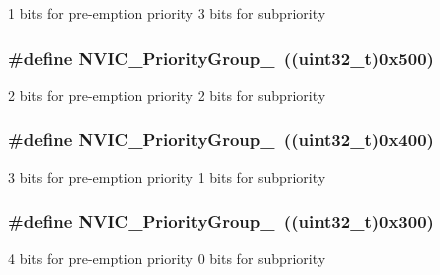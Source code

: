 \label{group__Preemption__Priority__Group_ga89bf0bf9e70f1a372a541b1b8d7493aa}
1 bits for pre-\/emption priority 3 bits for subpriority \hypertarget{group__Preemption__Priority__Group_ga505002e8b76aef65499ca371e40ec8b4}{
\subsubsection[{NVIC\_\-PriorityGroup\_\-2}]{\setlength{\rightskip}{0pt plus 5cm}\#define NVIC\_\-PriorityGroup\_~((uint32\_\-t)0x500)}}
\label{group__Preemption__Priority__Group_ga505002e8b76aef65499ca371e40ec8b4}
2 bits for pre-\/emption priority 2 bits for subpriority \hypertarget{group__Preemption__Priority__Group_ga49bdbee77d4a70339d63c80462d49b4d}{
\subsubsection[{NVIC\_\-PriorityGroup\_\-3}]{\setlength{\rightskip}{0pt plus 5cm}\#define NVIC\_\-PriorityGroup\_~((uint32\_\-t)0x400)}}
\label{group__Preemption__Priority__Group_ga49bdbee77d4a70339d63c80462d49b4d}
3 bits for pre-\/emption priority 1 bits for subpriority \hypertarget{group__Preemption__Priority__Group_gaf9020c585da2a299328f0b06dee391a2}{
\subsubsection[{NVIC\_\-PriorityGroup\_\-4}]{\setlength{\rightskip}{0pt plus 5cm}\#define NVIC\_\-PriorityGroup\_~((uint32\_\-t)0x300)}}
\label{group__Preemption__Priority__Group_gaf9020c585da2a299328f0b06dee391a2}
4 bits for pre-\/emption priority 0 bits for subpriority 